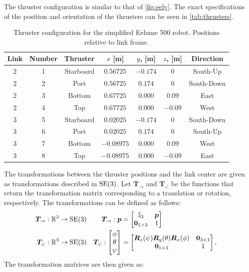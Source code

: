 The thruster configuration is similar to that of \autoref{fig:eely}. The exact
specifications of the position and orientation of the thrusters can be seen in
\autoref{tab:thrusters}.

\begin{table}[h]
    \centering
    \begin{tabular}{|c|c|c|c|c|c|c|}
        \hline
        Link & Number & Thruster & $x$ [m] & $y$, [m] & $z$, [m] & Direction \\ \hline
        $2$ & 1 & Starboard & $0.56725$ & $-0.174$ & $0$ & South-Up \\
        $2$ & 2 & Port & $0.56725$ & $0.174$ & $0$ & South-Down \\
        $2$ & 3 & Bottom & $0.67725$ & $0.000$ & $0.09$ & East \\
        $2$ & 4 & Top & $0.67725$ & $0.000$ & $-0.09$ & West \\ \hline
        $3$ & 5 & Starboard & $0.02025$ & $-0.174$ & $0$ & South-Down \\
        $3$ & 6 & Port & $0.02025$ & $0.174$ & $0$ & South-Up \\
        $3$ & 7 & Bottom & $-0.08975$ & $0.000$ & $0.09$ & West \\
        $3$ & 8 & Top & $-0.08975$ & $0.000$ & $-0.09$ & East \\
        \hline
    \end{tabular}
    \caption{Thruster configuration for the simplified Eelume 500 robot. Positions relative to link frame.}
    \label{tab:thrusters}
\end{table}

The transformations between the thruster positions and the link center are given
as transformations described in $\operatorname{SE}(3)$. Let $\bm{T}_{\rightarrow}$ and $\bm{T}_{\angle}$
be the functions that return the transformation matrix corresponding to a translation
or rotation, respectively. The transformations can be defined as follows:
\begin{subequations}
\begin{align}
    \bm{T}_{\rightarrow} : \mathbb{R}^3 &\to \operatorname{SE}(3) 
    &\bm{T}_{\rightarrow} :\bm{p} &= \begin{bmatrix} \mathbb{I}_3 & \bm{p} \\ \bm{0}_{1\times3} & 1 \end{bmatrix} \\
    \bm{T}_{\angle} : \mathbb{R}^3 &\to \operatorname{SE}(3)
    &\bm{T}_{\angle} : \begin{bmatrix}\phi \\ \theta \\ \psi \end{bmatrix} &= \begin{bmatrix}
        \bm{R}_z(\psi) \bm{R}_y(\theta) \bm{R}_x(\phi) & \bm{0}_{3\times1} \\
            \bm{0}_{1\times3} & 1
    \end{bmatrix},
\end{align}
\end{subequations}
The transformation matrices are then given as:

